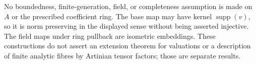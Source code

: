 \begin{remark}\label{spectrum:completed-residue-field-scope}
No boundedness, finite-generation, field, or completeness assumption is
made on $A$ or the prescribed coefficient ring. The base map may have
kernel $\operatorname{supp}(v)$, so it is norm preserving in the displayed
sense without being asserted injective. The field maps under ring pullback
are isometric embeddings. These constructions do not assert an extension
theorem for valuations or a description of finite analytic fibres by
Artinian tensor factors; those are separate results.
\end{remark}
